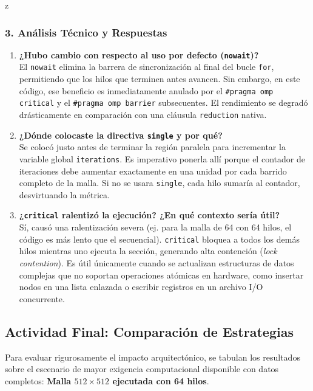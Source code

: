 z\documentclass[11pt,a4paper]{article}
\begin{document}
\subsubsection*{3. Análisis Técnico y Respuestas}

\begin{enumerate}
    \item \textbf{¿Hubo cambio con respecto al uso por defecto (\texttt{nowait})?} \\
    El \texttt{nowait} elimina la barrera de sincronización al final del bucle \texttt{for}, permitiendo que los hilos que terminen antes avancen. Sin embargo, en este código, ese beneficio es inmediatamente anulado por el \texttt{\#pragma omp critical} y el \texttt{\#pragma omp barrier} subsecuentes. El rendimiento se degradó drásticamente en comparación con una cláusula \texttt{reduction} nativa.

    \item \textbf{¿Dónde colocaste la directiva \texttt{single} y por qué?} \\
    Se colocó justo antes de terminar la región paralela para incrementar la variable global \texttt{iterations}. Es imperativo ponerla allí porque el contador de iteraciones debe aumentar exactamente en una unidad por cada barrido completo de la malla. Si no se usara \texttt{single}, cada hilo sumaría al contador, desvirtuando la métrica.

    \item \textbf{¿\texttt{critical} ralentizó la ejecución? ¿En qué contexto sería útil?} \\
    Sí, causó una ralentización severa (ej. para la malla de 64 con 64 hilos, el código es más lento que el secuencial). \texttt{critical} bloquea a todos los demás hilos mientras uno ejecuta la sección, generando alta contención (\textit{lock contention}). Es útil únicamente cuando se actualizan estructuras de datos complejas que no soportan operaciones atómicas en hardware, como insertar nodos en una lista enlazada o escribir registros en un archivo I/O concurrente.
\end{enumerate}

\subsection*{Actividad Final: Comparación de Estrategias}

Para evaluar rigurosamente el impacto arquitectónico, se tabulan los resultados sobre el escenario de mayor exigencia computacional disponible con datos completos: \textbf{Malla $512 \times 512$ ejecutada con 64 hilos}.
\end{document}
